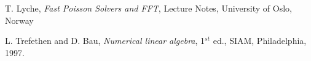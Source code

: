 \documentclass[11pt,a4paper,twoside]{article}
\begin{document}
\begin{thebibliography}{99}
T. Lyche,
\emph{Fast Poisson Solvers and FFT}, 
Lecture Notes, University of Oslo, Norway

L. Trefethen and D. Bau,
\emph{Numerical linear algebra},
1$^{st}$ ed., SIAM, Philadelphia, 1997.



\end{thebibliography}



\EndPaper%

\end{document}

